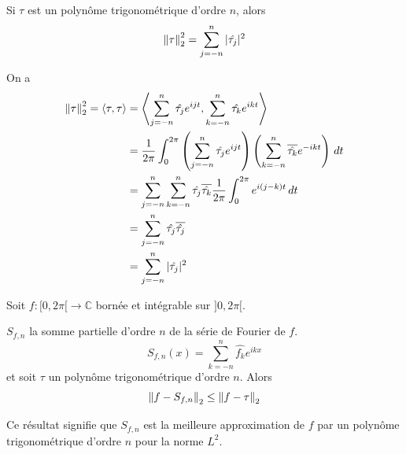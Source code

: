 \documentclass[a4paper,12pt]{article}
\begin{document}
\begin{corollaire}{}{}
    Si $\tau$ est un polynôme trigonométrique d'ordre $n$, alors
    $$
    \left\lVert\tau\right\rVert_2^2 = \sum_{j=-n}^n |\hat{\tau_j}|^2
    $$
\end{corollaire}

\begin{demonstration}
    On a
    \begin{align*}
        \left\lVert\tau\right\rVert_2^2 = \langle \tau, \tau \rangle &= \left\langle \sum_{j=-n}^n \hat{\tau_j} e^{ijt}, \sum_{k=-n}^n \hat{\tau_k} e^{ikt} \right\rangle \\
        &= \frac{1}{2\pi} \int_0^{2\pi} \left( \sum_{j=-n}^n \hat{\tau_j} e^{ijt} \right) \left( \sum_{k=-n}^n \overline{\hat{\tau_k}} e^{-ikt} \right) \, dt \\
        &= \sum_{j=-n}^n \sum_{k=-n}^n \hat{\tau_j} \overline{\hat{\tau_k}} \frac{1}{2\pi} \int_0^{2\pi} e^{i(j-k)t} \, dt \\
        &= \sum_{j=-n}^n \hat{\tau_j} \overline{\hat{\tau_j}} \\
        &= \sum_{j=-n}^n |\hat{\tau_j}|^2
    \end{align*}
\end{demonstration}

\begin{theoreme}{}{}
    Soit $f: [0, 2\pi[ \to \mathbb{C}$ bornée et intégrable sur $]0, 2\pi[$.

    $S_{f,n}$ la somme partielle d'ordre $n$ de la série de Fourier de $f$.
    $$
    S_{f,n}(x) = \sum_{k=-n}^n \hat{f_k} e^{ikx}
    $$
    et soit $\tau$ un polynôme trigonométrique d'ordre $n$. Alors
    $$
    \left\lVert f - S_{f,n}\right\rVert_2 \leq \left\lVert f - \tau\right\rVert_2
    $$
\end{theoreme}

\begin{remarque}
    Ce résultat signifie que $S_{f,n}$ est la meilleure approximation de $f$ par un polynôme trigonométrique d'ordre $n$ pour la norme $L^2$.
\end{remarque}
\end{document}
